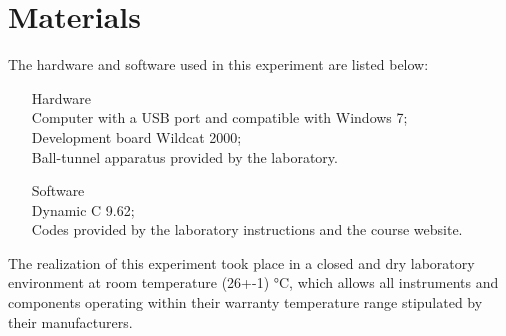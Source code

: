 \section{Materials}

The hardware and software used in this experiment are listed below:

\begin{enumerate}
\item[Hardware]
\\ Computer with a USB port and compatible with Windows 7;
\\ Development board Wildcat 2000;
\\ Ball-tunnel apparatus provided by the laboratory.
\\
\item[Software]
\\ Dynamic C 9.62;
\\ Codes provided by the laboratory instructions and the course website.
\\
\end{enumerate}
The realization of this experiment took place in a closed and dry laboratory environment at room temperature (26+-1)  °C, which allows all instruments and components operating within their warranty temperature range stipulated by their manufacturers.
